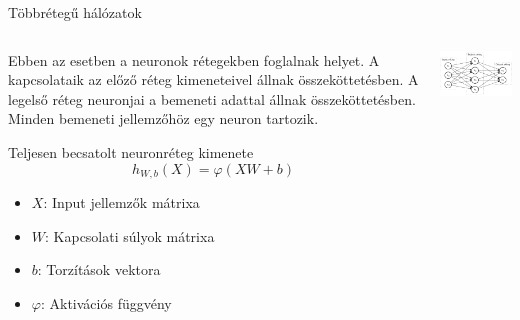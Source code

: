\documentclass[english, aspectratio=169]{beamer}
\begin{document}
\begin{frame}{Többrétegű hálózatok}
\begin{columns}
\begin{column}{.5\textwidth}
Ebben az esetben a neuronok rétegekben foglalnak helyet. A kapcsolataik az előző réteg kimeneteivel állnak összeköttetésben. A legelső réteg neuronjai a bemeneti adattal állnak összeköttetésben. Minden bemeneti jellemzőhöz egy neuron tartozik.\par\smallskip
\begin{block}{Teljesen becsatolt neuronréteg kimenete}
\[
h_{W,b}(X)=\varphi(XW+b)
\]
\vspace{-0.5cm}
\begin{itemize}
	\item $X$: Input jellemzők mátrixa
	\item $W$: Kapcsolati súlyok mátrixa
	\item $b$: Torzítások vektora
	\item $\varphi$: Aktivációs függvény
\end{itemize}
\end{block}
\end{column}
\begin{column}{.5\textwidth}
\begin{center}
\includegraphics[width=7cm, keepaspectratio]{graphs/dl_0.png}
\end{center}
\end{column}
\end{columns}
\end{frame}
\end{document}
